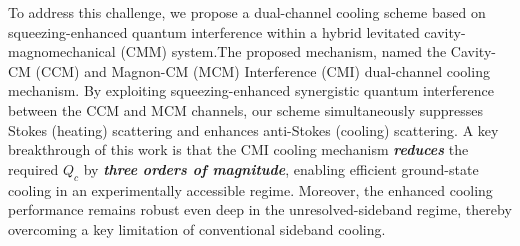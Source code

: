 \documentclass[aps, prresearch, reprint, nofootinbib, longbibliography]{revtex4-2}
\begin{document}
To address this challenge, we propose a dual-channel cooling scheme based on squeezing-enhanced quantum interference within a hybrid levitated cavity-magnomechanical (CMM) system.\hspace{0.5em}The
proposed mechanism, named the Cavity-CM (CCM) and Magnon-CM (MCM)  Interference (CMI) dual-channel cooling mechanism. %
By exploiting squeezing-enhanced synergistic quantum interference between the CCM and MCM channels, our scheme simultaneously suppresses Stokes (heating) scattering and enhances anti-Stokes (cooling) scattering.
A key breakthrough of this work is that the CMI cooling mechanism \textbf{\textit{reduces}}
the required $Q_c$ by  \textbf{\textit{three orders of magnitude}}, enabling efficient ground-state cooling in an experimentally accessible regime.
Moreover, the enhanced cooling performance remains robust even deep in the unresolved-sideband regime, thereby overcoming a key limitation of conventional sideband cooling.
\end{document}
